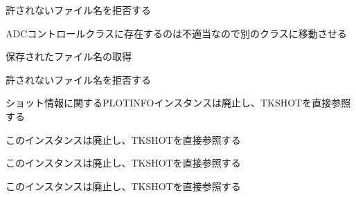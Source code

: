 
\begin{DoxyRefList}
\item[\label{todo__todo000002}%
\Hypertarget{todo__todo000002}%
メンバ \hyperlink{class_t_k_a_d_c_c_o_n_t_r_o_l_afa385509f61162198950676d279f4c3c}{T\+K\+A\+D\+C\+C\+O\+N\+T\+R\+OL\+:\+:Delete} (std\+::string file\+\_\+name)]許されないファイル名を拒否する  
\item[\label{todo__todo000003}%
\Hypertarget{todo__todo000003}%
メンバ \hyperlink{class_t_k_a_d_c_c_o_n_t_r_o_l_afbeba1999b1d5afeda2d3b755d20b2ce}{T\+K\+A\+D\+C\+C\+O\+N\+T\+R\+OL\+:\+:Get\+Last\+Local\+Shot\+Number} ()]A\+D\+Cコントロールクラスに存在するのは不適当なので別のクラスに移動させる  
\item[\label{todo__todo000001}%
\Hypertarget{todo__todo000001}%
メンバ \hyperlink{class_t_k_a_d_c_c_o_n_t_r_o_l_a832915af5a7240efeef5c3fa139b99af}{T\+K\+A\+D\+C\+C\+O\+N\+T\+R\+OL\+:\+:Save\+Shot} (std\+::string file\+\_\+name)]保存されたファイル名の取得 

許されないファイル名を拒否する  
\item[\label{todo__todo000004}%
\Hypertarget{todo__todo000004}%
クラス \hyperlink{class_t_k_p_l_o_t_1_1_p_l_o_t_i_n_f_o}{T\+K\+P\+L\+OT\+:\+:P\+L\+O\+T\+I\+N\+FO} ]ショット情報に関する\+P\+L\+O\+T\+I\+N\+F\+Oインスタンスは廃止し、\+T\+K\+S\+H\+O\+Tを直接参照する  
\item[\label{todo__todo000007}%
\Hypertarget{todo__todo000007}%
メンバ \hyperlink{class_t_k_p_l_o_t_1_1_p_l_o_t_i_n_f_o_a801d16eb357241d4f4eeef8c6393bbc4}{T\+K\+P\+L\+OT\+:\+:P\+L\+O\+T\+I\+N\+FO\+:\+:channel\+\_\+number} ]このインスタンスは廃止し、\+T\+K\+S\+H\+O\+Tを直接参照する  
\item[\label{todo__todo000005}%
\Hypertarget{todo__todo000005}%
メンバ \hyperlink{class_t_k_p_l_o_t_1_1_p_l_o_t_i_n_f_o_a18a67313f8bb54564f35f6e6eddef899}{T\+K\+P\+L\+OT\+:\+:P\+L\+O\+T\+I\+N\+FO\+:\+:data\+\_\+file\+\_\+name} ]このインスタンスは廃止し、\+T\+K\+S\+H\+O\+Tを直接参照する  
\item[\label{todo__todo000006}%
\Hypertarget{todo__todo000006}%
メンバ \hyperlink{class_t_k_p_l_o_t_1_1_p_l_o_t_i_n_f_o_ae98bf84fdf14074b4f7804f0617aa902}{T\+K\+P\+L\+OT\+:\+:P\+L\+O\+T\+I\+N\+FO\+:\+:model\+\_\+name} ]このインスタンスは廃止し、\+T\+K\+S\+H\+O\+Tを直接参照する 
\end{DoxyRefList}
